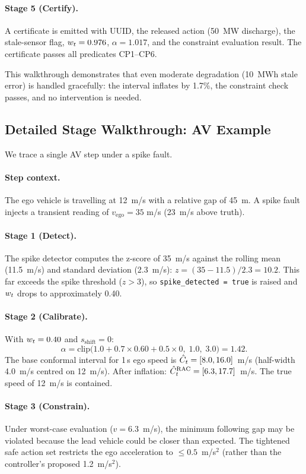 \paragraph{Stage 5 (Certify).}
A certificate is emitted with UUID, the released action (50~MW discharge), the
stale-sensor flag, $w_t = 0.976$, $\alpha = 1.017$, and the constraint evaluation
result.  The certificate passes all predicates CP1--CP6.

This walkthrough demonstrates that even moderate degradation (10~MWh stale error) is
handled gracefully: the interval inflates by 1.7\%, the constraint check passes, and
no intervention is needed.

\subsection{Detailed Stage Walkthrough: AV Example}

We trace a single AV step under a spike fault.

\paragraph{Step context.}  The ego vehicle is travelling at 12~m/s with a relative
gap of 45~m.  A spike fault injects a transient reading of $v_{\mathrm{ego}} = 35$
m/s (23~m/s above truth).

\paragraph{Stage 1 (Detect).}
The spike detector computes the z-score of 35~m/s against the rolling mean (11.5~m/s)
and standard deviation (2.3~m/s): $z = (35 - 11.5)/2.3 = 10.2$.  This far exceeds
the spike threshold ($z > 3$), so \texttt{spike\_detected = true} is raised and
$w_t$ drops to approximately 0.40.

\paragraph{Stage 2 (Calibrate).}
With $w_t = 0.40$ and $s_{\mathrm{shift}} = 0$:
\[
  \alpha = \mathrm{clip}\!\bigl(1.0 + 0.7 \times 0.60 + 0.5 \times 0,\; 1.0,\; 3.0\bigr
  ) = 1.42.
\]
The base conformal interval for 1\,s ego speed is $\hat{C}_t = [8.0, 16.0]$~m/s
(half-width 4.0~m/s centred on 12~m/s).  After inflation:
$\hat{C}_t^{\mathrm{RAC}} = [6.3, 17.7]$~m/s.  The true speed of 12~m/s is contained.

\paragraph{Stage 3 (Constrain).}
Under worst-case evaluation ($v = 6.3$~m/s), the minimum following gap may be
violated because the lead vehicle could be closer than expected.  The tightened safe
action set restricts the ego acceleration to $\le 0.5$~m/s$^2$ (rather than the
controller's proposed 1.2~m/s$^2$).

